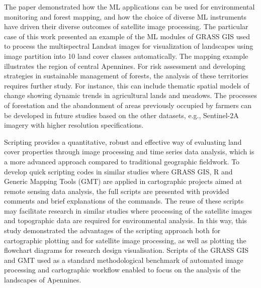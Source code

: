 \documentclass[jimaging,article,accept,pdftex,oneauthor]{Definitions/mdpi}
\begin{document}
The paper demonstrated how the ML applications can be used for environmental monitoring and forest mapping, and how the choice of diverse ML instruments have driven their diverse outcomes of satellite image processing. The particular case of this work presented an example of the ML modules of GRASS GIS used to process the multispectral Landsat images for visualization of landscapes using image partition into 10 land cover classes automatically. The mapping example illustrates the region of central Apennines. For risk assessment and developing strategies in sustainable management of forests, the analysis of these territories requires further study. For instance, this can include thematic spatial models of change showing dynamic trends in agricultural lands and meadows. The processes of forestation and the abandonment of areas previously occupied by farmers can be developed in future studies based on the other datasets, e.g., Sentinel-2A imagery with higher resolution specifications.

Scripting provides a quantitative, robust and effective way of evaluating land cover properties through image processing and time series data analysis, which is a more advanced approach compared to traditional geographic fieldwork. To develop quick scripting codes in similar studies where GRASS GIS, R and Generic Mapping Tools (GMT) are applied in cartographic projects aimed at remote sensing data analysis, the full scripts are presented with provided comments and brief explanations of the commands. The reuse of these scripts may facilitate research in similar studies where processing of the satellite images and topographic data are required for environmental analysis. In this way, this study demonstrated the advantages of the scripting approach both for cartographic plotting and for satellite image processing, as well as plotting the flowchart diagrams for research design visualisation. Scripts of the GRASS GIS and GMT used as a standard methodological benchmark of automated image processing and cartographic workflow enabled to focus on the analysis of the landscapes of Apennines. 
\end{document}
